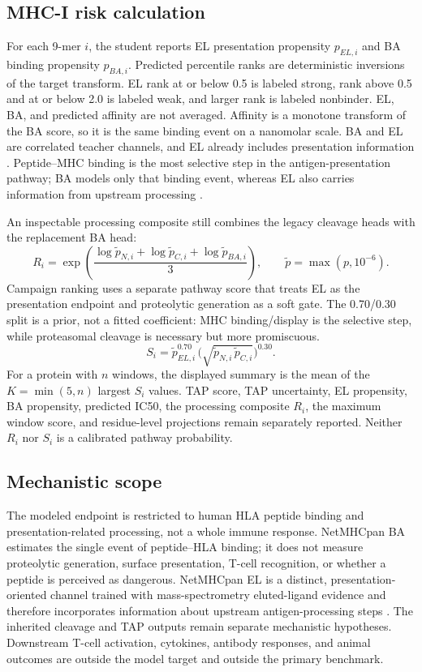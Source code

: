 \documentclass{article}
\begin{document}
\subsection{MHC-I risk calculation}
For each 9-mer $i$, the student reports EL presentation propensity $p_{EL,i}$ and BA binding propensity $p_{BA,i}$. Predicted percentile ranks are deterministic inversions of the target transform. EL rank at or below 0.5 is labeled strong, rank above 0.5 and at or below 2.0 is labeled weak, and larger rank is labeled nonbinder. EL, BA, and predicted affinity are not averaged. Affinity is a monotone transform of the BA score, so it is the same binding event on a nanomolar scale. BA and EL are correlated teacher channels, and EL already includes presentation information \cite{reynisson2020netmhc}. Peptide--MHC binding is the most selective step in the antigen-presentation pathway; BA models only that binding event, whereas EL also carries information from upstream processing \cite{reynisson2020netmhc}.

An inspectable processing composite still combines the legacy cleavage heads with the replacement BA head:
\begin{equation}
 R_i=\exp\left(\frac{\log \tilde p_{N,i}+\log \tilde p_{C,i}+\log \tilde p_{BA,i}}{3}\right),
 \qquad \tilde p=\max(p,10^{-6}).
\end{equation}
Campaign ranking uses a separate pathway score that treats EL as the presentation endpoint and proteolytic generation as a soft gate. The 0.70/0.30 split is a prior, not a fitted coefficient: MHC binding/display is the selective step, while proteasomal cleavage is necessary but more promiscuous.
\begin{equation}
 S_i=\tilde p_{EL,i}^{0.70}\,\bigl(\sqrt{\tilde p_{N,i}\,\tilde p_{C,i}}\bigr)^{0.30}.
\end{equation}
For a protein with $n$ windows, the displayed summary is the mean of the $K=\min(5,n)$ largest $S_i$ values. TAP score, TAP uncertainty, EL propensity, BA propensity, predicted IC50, the processing composite $R_i$, the maximum window score, and residue-level projections remain separately reported. Neither $R_i$ nor $S_i$ is a calibrated pathway probability.

\subsection{Mechanistic scope}
The modeled endpoint is restricted to human HLA peptide binding and presentation-related processing, not a whole immune response. NetMHCpan BA estimates the single event of peptide--HLA binding; it does not measure proteolytic generation, surface presentation, T-cell recognition, or whether a peptide is perceived as dangerous. NetMHCpan EL is a distinct, presentation-oriented channel trained with mass-spectrometry eluted-ligand evidence and therefore incorporates information about upstream antigen-processing steps \cite{reynisson2020netmhc}. The inherited cleavage and TAP outputs remain separate mechanistic hypotheses. Downstream T-cell activation, cytokines, antibody responses, and animal outcomes are outside the model target and outside the primary benchmark.
\end{document}
